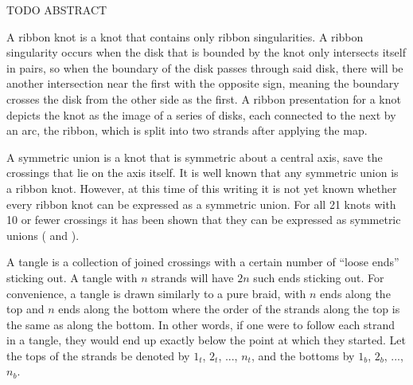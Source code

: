 
\theorems

\begin{paperabstract}
TODO ABSTRACT
\end{paperabstract}
\begin{paper}

A ribbon knot is a knot that contains only ribbon singularities.
A ribbon singularity occurs when the disk that is bounded by the knot only
intersects itself in pairs, so when the boundary of the disk passes through
said disk, there will be another intersection near the first with the opposite
sign, meaning the boundary crosses the disk from the other side as the first.
A ribbon presentation for a knot depicts the knot as the image of a series
of disks, each connected to the next by an arc, the ribbon, which is split into
two strands after applying the map.

A symmetric union is a knot that is symmetric about a central axis, save the
crossings that lie on the axis itself.
It is well known that any symmetric union is a ribbon knot.
However, at this time of this writing it is not yet known whether every ribbon
knot can be expressed as a symmetric union.
For all 21 knots with 10 or fewer crossings it has been shown that they can be
expressed as symmetric unions (\cite{oneknot} and \cite{manyknots}).

A tangle is a collection of joined crossings with a certain number of ``loose
ends'' sticking out.
A tangle with $n$ strands will have $2n$ such ends sticking out.
For convenience, a tangle is drawn similarly to a pure braid, with $n$ ends
along the top and $n$ ends along the bottom where the order of the strands along
the top is the same as along the bottom.
In other words, if one were to follow each strand in a tangle, they would end up
exactly below the point at which they started.
Let the tops of the strands be denoted by $1_t$, $2_t$, ..., $n_t$, and the
bottoms  by $1_b$, $2_b$, ..., $n_b$.



\end{paper}
